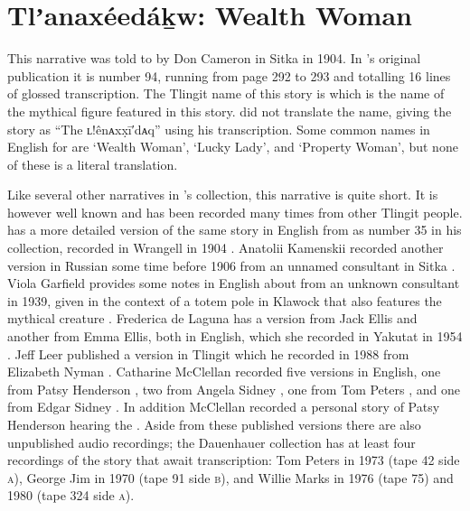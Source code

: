 
\resetexcnt
\chapter{Tlʼanaxéedáḵw: Wealth Woman}\label{ch:94-wealth-woman}

This narrative was told to \citeauthor{swanton:1909} by  Don Cameron in Sitka in 1904.
In \citeauthor{swanton:1909}’s original publication it is number 94, running from page 292 to 293 and totalling 16 lines of glossed transcription.
The Tlingit name of this story is  which is the name of the mythical figure featured in this story.
\citeauthor{swanton:1909} did not translate the name, giving the story as “The ʟ!ênᴀxx̣ī′dᴀq” using his transcription.
Some common names in English for  are ‘Wealth Woman’, ‘Lucky Lady’, and ‘Property Woman’, but none of these is a literal translation.

Like several other narratives in \citeauthor{swanton:1909}’s collection, this narrative is quite short.
It is however well known and has been recorded many times from other Tlingit people.
\citeauthor{swanton:1909} has a more detailed version of the same story in English from  as number 35 in his collection, recorded in Wrangell in 1904 \parencite[173–175]{swanton:1909}.
Anatolii Kamenskii recorded another version in Russian some time before 1906 from an unnamed consultant in Sitka \parencites{kamenskii:1906}[68–70]{kamenskii-kan:1985}.
Viola Garfield provides some notes in English about  from an unknown consultant in 1939, given in the context of a totem pole in Klawock that also features the  mythical creature \parencite[117–118]{garfield-forrest:1948}.
Frederica de Laguna has a version from  Jack Ellis and another from  Emma Ellis, both in English, which she recorded in Yakutat in 1954 \parencite[884]{de-laguna:1972}.
Jeff Leer published a version in Tlingit which he recorded in 1988 from  Elizabeth Nyman \parencite[218–255]{nyman:1993}.
Catharine McClellan recorded five versions in English, one from  Patsy Henderson \parencite[238–241]{mcclellan-cruikshank:2007b}, two from  Angela Sidney \parencite[344–348, 348–353]{mcclellan-cruikshank:2007b}, one from  Tom Peters \parencite[715–719]{mcclellan-cruikshank:2007c}, and one from  Edgar Sidney \parencite[747–753]{mcclellan-cruikshank:2007c}.
In addition McClellan recorded a personal story of  Patsy Henderson hearing the  \parencite[241–244]{mcclellan-cruikshank:2007b}.
Aside from these published versions there are also unpublished audio recordings;
the Dauenhauer collection has at least four recordings of the story that await transcription:  Tom Peters in 1973 (tape 42 side \textsc{a}),  George Jim in 1970 (tape 91 side \textsc{b}), and  Willie Marks in 1976 (tape 75) and 1980 (tape 324 side \textsc{a}).

